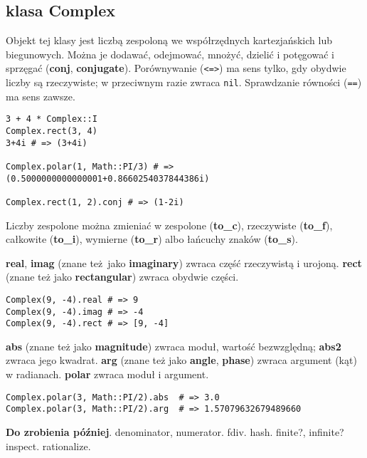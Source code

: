 \subsection{klasa Complex}
Objekt tej klasy jest liczbą zespoloną we współrzędnych kartezjańskich lub biegunowych.
Można je dodawać, odejmować, mnożyć, dzielić i potęgować i sprzęgać (\textbf{conj}, \textbf{conjugate}).
Porównywanie (\texttt{<=>}) ma sens tylko, gdy obydwie liczby są rzeczywiste; w przeciwnym razie zwraca \texttt{nil}.
Sprawdzanie równości (\texttt{==}) ma sens zawsze.
\begin{verbatim}
3 + 4 * Complex::I
Complex.rect(3, 4)
3+4i # => (3+4i)

Complex.polar(1, Math::PI/3) # => (0.5000000000000001+0.8660254037844386i)

Complex.rect(1, 2).conj # => (1-2i)
\end{verbatim}

Liczby zespolone można zmieniać w zespolone (\textbf{to\_c}), rzeczywiste (\textbf{to\_f}), całkowite (\textbf{to\_i}), wymierne (\textbf{to\_r}) albo łańcuchy znaków (\textbf{to\_s}).

\textbf{real}, \textbf{imag} (znane też jako \textbf{imaginary}) zwraca część rzeczywistą i urojoną.
\textbf{rect} (znane też jako \textbf{rectangular}) zwraca obydwie części.
\begin{verbatim}
Complex(9, -4).real # => 9
Complex(9, -4).imag # => -4
Complex(9, -4).rect # => [9, -4]
\end{verbatim}

\textbf{abs} (znane też jako \textbf{magnitude}) zwraca moduł, wartość bezwzględną; \textbf{abs2} zwraca jego kwadrat.
\textbf{arg} (znane też jako \textbf{angle}, \textbf{phase}) zwraca argument (kąt) w radianach.
\textbf{polar} zwraca moduł i argument.
\begin{verbatim}
Complex.polar(3, Math::PI/2).abs  # => 3.0
Complex.polar(3, Math::PI/2).arg  # => 1.57079632679489660
\end{verbatim}


\textbf{Do zrobienia później}.
denominator, numerator.
fdiv.
hash.
finite?, infinite?
inspect.
rationalize.
